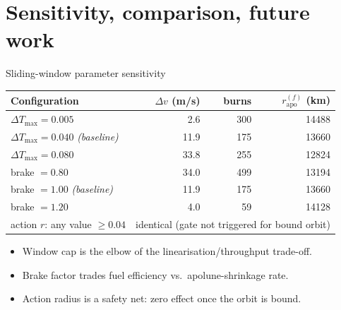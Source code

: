 \documentclass[10pt,aspectratio=169]{beamer}
\begin{document}
\section{Sensitivity, comparison, future work}

\begin{frame}{Sliding-window parameter sensitivity}
\small
\centering
\begin{tabular}{lrrr}
\toprule
Configuration & $\Delta v$ (m/s) & burns & $r_\mathrm{apo}^{(f)}$ (km) \\
\midrule
$\Delta T_\mathrm{max} = 0.005$ & 2.6  & 300 & 14488 \\
$\Delta T_\mathrm{max} = 0.040$ \emph{(baseline)} & 11.9 & 175 & 13660 \\
$\Delta T_\mathrm{max} = 0.080$ & 33.8 & 255 & 12824 \\
\midrule
brake $= 0.80$ & 34.0 & 499 & 13194 \\
brake $= 1.00$ \emph{(baseline)} & 11.9 & 175 & 13660 \\
brake $= 1.20$ & 4.0  & 59  & 14128 \\
\midrule
action $r$: any value $\ge 0.04$ &
   \multicolumn{3}{l}{identical (gate not triggered for bound orbit)} \\
\bottomrule
\end{tabular}

\medskip
\begin{itemize}[itemsep=2pt]
  \item Window cap is the elbow of the linearisation/throughput
    trade-off.
  \item Brake factor trades fuel efficiency vs.\ apolune-shrinkage
    rate.
  \item Action radius is a safety net: zero effect once the orbit
    is bound.
\end{itemize}
\end{frame}
\end{document}
